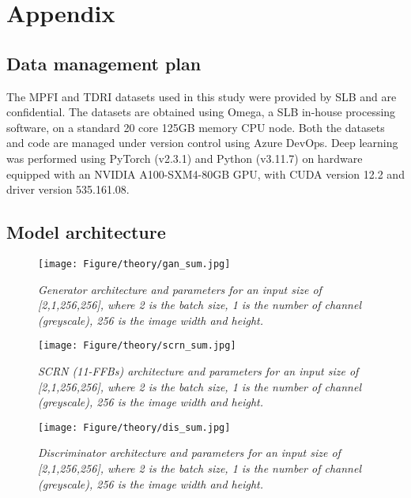 \chapter{Appendix}
\section{Data management plan} \label{ap:data}
The MPFI and TDRI datasets used in this study were provided by SLB and are confidential. The datasets are obtained using Omega, a SLB in-house processing software, on a standard 20 core 125GB memory CPU node. Both the datasets and code are managed under version control using Azure DevOps. Deep learning was performed using PyTorch (v2.3.1) and Python (v3.11.7) on hardware equipped with an NVIDIA A100-SXM4-80GB GPU, with CUDA version 12.2 and driver version 535.161.08.

\section{Model architecture}  \label{ap:ap}
\begin{figure}[ht]
	\centering
	\texttt{[image: Figure/theory/gan\_sum.jpg]} %
	\caption{\textit{Generator architecture and parameters for an input size of [2,1,256,256], where 2 is the batch size, 1 is the number of channel (greyscale), 256 is the image width and height.}}
	\label{fig:gan_sum}
\end{figure}
\begin{figure}[ht]
	\centering
	\texttt{[image: Figure/theory/scrn\_sum.jpg]} %
	\caption{\textit{SCRN (11-FFBs) architecture and parameters for an input size of [2,1,256,256], where 2 is the batch size, 1 is the number of channel (greyscale), 256 is the image width and height.}}
	\label{fig:scrn_sum}
\end{figure}
\begin{figure}[ht]
	\centering
	\texttt{[image: Figure/theory/dis\_sum.jpg]} %
	\caption{\textit{Discriminator architecture and parameters for an input size of [2,1,256,256], where 2 is the batch size, 1 is the number of channel (greyscale), 256 is the image width and height.}}
	\label{fig:dis_sum}
\end{figure}